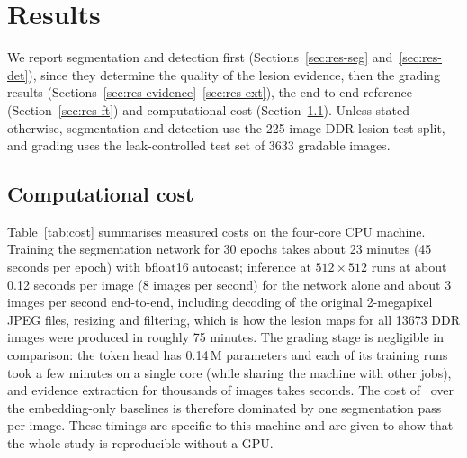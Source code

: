 \section{Results}
\label{sec:results}
We report segmentation and detection first (Sections~\ref{sec:res-seg} and~\ref{sec:res-det}), since they determine the quality of the lesion evidence, then the grading results (Sections~\ref{sec:res-evidence}--\ref{sec:res-ext}), the end-to-end reference (Section~\ref{sec:res-ft}) and computational cost (Section~\ref{sec:res-cost}). Unless stated otherwise, segmentation and detection use the 225-image DDR lesion-test split, and grading uses the leak-controlled test set of 3633 gradable images.







\subsection{Computational cost}
\label{sec:res-cost}
Table~\ref{tab:cost} summarises measured costs on the four-core CPU machine. Training the segmentation network for 30 epochs takes about 23 minutes (45 seconds per epoch) with bfloat16 autocast; inference at $512\times512$ runs at about 0.12 seconds per image (8 images per second) for the network alone and about 3 images per second end-to-end, including decoding of the original 2-megapixel JPEG files, resizing and filtering, which is how the lesion maps for all \num{13673} DDR images were produced in roughly 75 minutes. The grading stage is negligible in comparison: the token head has 0.14\,M parameters and each of its training runs took a few minutes on a single core (while sharing the machine with other jobs), and evidence extraction for thousands of images takes seconds. The cost of \mname\ over the embedding-only baselines is therefore dominated by one segmentation pass per image. These timings are specific to this machine and are given to show that the whole study is reproducible without a GPU.

\begin{table}[!htbp]
\centering
\caption{Model sizes and measured costs (four CPU cores, bfloat16 autocast where applicable).}
\label{tab:cost}
\small
{}
\end{table}
